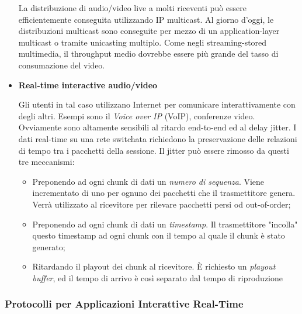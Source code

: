 \begin{itemize}
La distribuzione di audio/video live a molti riceventi può essere efficientemente conseguita utilizzando IP multicast. Al giorno d'oggi, le distribuzioni multicast sono conseguite per mezzo di un application-layer multicast o tramite unicasting multiplo.
Come negli streaming-stored multimedia, il throughput medio dovrebbe essere più grande del tasso di consumazione del video.


\item{\textbf{Real-time interactive audio/video}}

Gli utenti in tal caso utilizzano Internet per comunicare interattivamente con degli altri. Esempi sono il \textit{Voice over IP} (VoIP), conferenze video.
Ovviamente sono altamente sensibili al ritardo end-to-end ed al delay jitter.
I dati real-time su una rete switchata richiedono la preservazione delle relazioni di tempo tra i pacchetti della sessione. 
Il jitter può essere rimosso da questi tre meccanismi:

\begin{itemize}

\item Preponendo ad ogni chunk di dati un \textit{numero di sequenza}. Viene incrementato di uno per ognuno dei pacchetti che il trasmettitore genera. Verrà utilizzato al ricevitore per rilevare pacchetti persi od out-of-order;

\item Preponendo ad ogni chunk di dati un \textit{timestamp}. Il trasmettitore "incolla" questo timestamp ad ogni chunk con il tempo al quale il chunk è stato generato;

\item Ritardando il playout dei chunk al ricevitore. \`E richiesto un \textit{playout buffer}, ed il tempo di arrivo è così separato dal tempo di riproduzione

\end{itemize}

\end{itemize}


\subsubsection{Protocolli per Applicazioni Interattive Real-Time}

